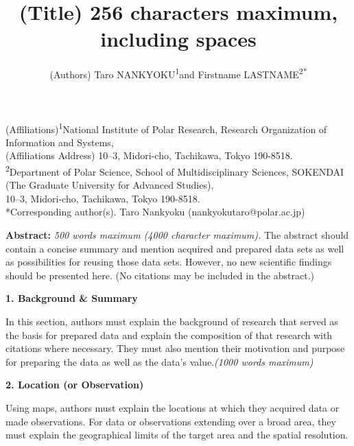 \documentclass[english]{article}
\begin{document}
\title{\bf(Title) 256 characters maximum, including spaces}

\author{(Authors) Taro NANKYOKU\textsuperscript{1}and Firstname LASTNAME\textsuperscript{2{*}}}

\maketitle
\thispagestyle{fancy}

\begin{center}
(Affiliations)\textsuperscript{1}National Institute of Polar Research, Research Organization of Information and Systems,\\
(Affiliations Address) 10–3, Midori-cho, Tachikawa, Tokyo 190-8518.\\
\textsuperscript{2}Department of Polar Science, School of Multidisciplinary Sciences, SOKENDAI (The Graduate University for Advanced Studies),\\
10–3, Midori-cho, Tachikawa, Tokyo 190-8518.\\
{*}Corresponding author(s). Taro Nankyoku (nankyokutaro@polar.ac.jp)

\end{center}

\vspace{1cm}

{\bf Abstract:} {\it500 words maximum (4000 character maximum).} The abstract should contain a concise summary and mention acquired and prepared data sets as well as possibilities for reusing those data sets. However, no new scientific findings should be presented here. (No citations may be included in the abstract.)


\begin{center}
{\bf 1. Background \& Summary}
\end{center}

 In this section, authors must explain the background of research that served as the basis for prepared data and explain the composition of that research with citations where necessary. They must also mention their motivation and purpose for preparing the data as well as the data’s value.{\it (1000 words maximum)}


\begin{center}
{\bf 2. Location (or Observation)}
\end{center}

 Using maps, authors must explain the locations at which they acquired data or made observations. For data or observations extending over a broad area, they must explain the geographical limits of the target area and the spatial resolution.
\end{document}
